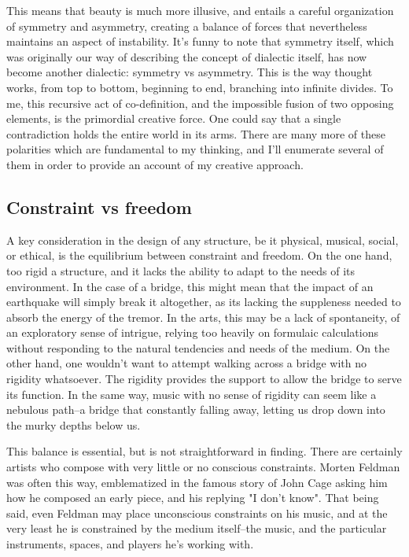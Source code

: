 \documentclass[12pt,twoside,maitrise]{dms_ks}
\theoremstyle{definition}
\begin{document}
This means that beauty is much more illusive, and entails a careful organization of symmetry and asymmetry, creating a balance of forces that nevertheless maintains an aspect of instability.
It’s funny to note that symmetry itself, which was originally our way of describing the concept of dialectic itself, has now become another dialectic: symmetry vs asymmetry.
This is the way thought works, from top to bottom, beginning to end, branching into infinite divides.
To me, this recursive act of co-definition, and the impossible fusion of two opposing elements, is the primordial creative force.
One could say that a single contradiction holds the entire world in its arms.
There are many more of these polarities which are fundamental to my thinking, and I’ll enumerate several of them in order to provide an account of my creative approach.

\subsection{Constraint vs freedom}

A key consideration in the design of any structure, be it physical, musical, social, or ethical, is the equilibrium between constraint and freedom.
On the one hand, too rigid a structure, and it lacks the ability to adapt to the needs of its environment.
In the case of a bridge, this might mean that the impact of an earthquake will simply break it altogether, as its lacking the suppleness needed to absorb the energy of the tremor.
In the arts, this may be a lack of spontaneity, of an exploratory sense of intrigue, relying too heavily on formulaic calculations without responding to the natural tendencies and needs of the medium.
On the other hand, one wouldn't want to attempt walking across a bridge with no rigidity whatsoever.
The rigidity provides the support to allow the bridge to serve its function.
In the same way, music with no sense of rigidity can seem like a nebulous path--a bridge that constantly falling away, letting us drop down into the murky depths below us.

This balance is essential, but is not straightforward in finding.
There are certainly artists who compose with very little or no conscious constraints.
Morten Feldman was often this way, emblematized in the famous story of John Cage asking him how he composed an early piece, and his replying "I don't know".
That being said, even Feldman may place unconscious constraints on his music, and at the very least he is constrained by the medium itself--the music, and the particular instruments, spaces, and players he's working with.
\end{document}
